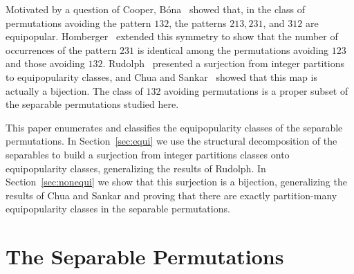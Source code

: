 \documentclass[10pt]{article}
\theoremstyle{definition}
\numberwithin{equation}{section}
\numberwithin{figure}{section}
\begin{document}
Motivated by a question of Cooper, B\'ona~\cite{bona:absence, bona:surprising} showed that, in the class of permutations avoiding the pattern $132$, the patterns $213, 231$, and $312$ are equipopular.  Homberger~\cite{homberger:expected} extended this symmetry to show that the number of occurrences of the pattern $231$ is identical among the permutations avoiding $123$ and those avoiding $132$. Rudolph~\cite{rudolph:popularity} presented a surjection from integer partitions to equipopularity classes, and Chua and Sankar~\cite{chua:popularity} showed that this map is actually a bijection. The class of $132$ avoiding permutations is a proper subset of the separable permutations studied here. 

  This paper enumerates and classifies the equipopularity classes of the separable permutations. In Section~\ref{sec:equi} we use the structural decomposition of the separables to build a surjection from integer partitions classes onto equipopularity classes, generalizing the results of Rudolph. In Section~\ref{sec:nonequi} we show that this surjection is a bijection, generalizing the results of Chua and Sankar and proving that there are exactly partition-many equipopularity classes in the separable permutations. 






\section{The Separable Permutations}
  
\end{document}
